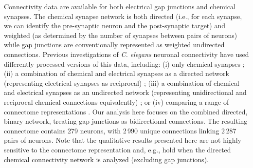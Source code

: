 \documentclass[10pt,letterpaper]{article}
\begin{document}
Connectivity data are available for both electrical gap junctions and chemical synapses.
The chemical synapse network is both directed (i.e., for each synapse, we can identify the pre-synaptic neuron and the post-synaptic target) and weighted (as determined by the number of synapses between pairs of neurons) while gap junctions are conventionally represented as weighted  undirected connections.
Previous investigations of \emph{C. elegans} neuronal connectivity have used differently processed versions of this data, including:
(i) only chemical synapses \cite{Kashtan:2004ev};
(ii) a combination of chemical and electrical synapses as a directed network (representing electrical synapses as reciprocal) \cite{Azulay:2016cg, Kim:2016gl};
(iii) a combination of chemical and electrical synapses as an undirected network (representing unidirectional and reciprocal chemical connections equivalently) \cite{Towlson2013, Kim:2014bu, Pavlovic:2014gx, van2017guiding};
or (iv) comparing a range of connectome representations \cite{Pan:2010jt}.
Our analysis here focuses on the combined directed, binary network, treating gap junctions as bidirectional connections.
The resulting connectome contains 279 neurons, with 2\,990 unique connections linking 2\,287 pairs of neurons.
Note that the qualitative results presented here are not highly sensitive to the connectome representation and, e.g., hold when the directed chemical connectivity network is analyzed (excluding gap junctions).
\end{document}
